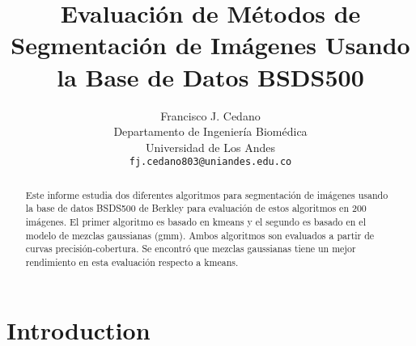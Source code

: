 \documentclass[10pt,twocolumn,letterpaper]{article}
\begin{document}
\title{Evaluaci\'on de M\'etodos de Segmentación de Im\'agenes Usando la Base de Datos BSDS500}

\author{Francisco J. Cedano\\
Departamento de Ingenier\'ia Biom\'edica\\
Universidad de Los Andes\\
{\tt\small fj.cedano803@uniandes.edu.co}
}%


\maketitle

\begin{abstract}
   Este informe estudia dos diferentes algoritmos para segmentaci\'on de im\'agenes usando la base de datos BSDS500 de Berkley para evaluaci\'on de estos algoritmos en 200 im\'agenes. El primer algoritmo es basado en kmeans y el segundo es basado en el modelo de mezclas gaussianas (gmm). Ambos algoritmos son evaluados a partir de curvas precisi\'on-cobertura. Se encontr\'o que mezclas gaussianas tiene un mejor rendimiento en esta evaluaci\'on respecto a kmeans.
\end{abstract}

\section{Introduction}
\end{document}
